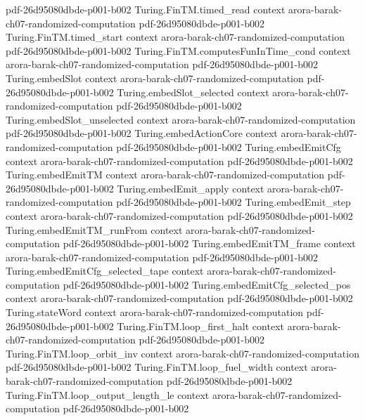 \begin{theorem}
  {pdf-26d95080dbde-p001-b002}
\proofstep
  {Turing.FinTM.timed_read}
  {context}
  {arora-barak-ch07-randomized-computation}
  {pdf-26d95080dbde-p001-b002}
\proofstep
  {Turing.FinTM.timed_start}
  {context}
  {arora-barak-ch07-randomized-computation}
  {pdf-26d95080dbde-p001-b002}
\proofstep
  {Turing.FinTM.computesFunInTime_cond}
  {context}
  {arora-barak-ch07-randomized-computation}
  {pdf-26d95080dbde-p001-b002}
\proofstep
  {Turing.embedSlot}
  {context}
  {arora-barak-ch07-randomized-computation}
  {pdf-26d95080dbde-p001-b002}
\proofstep
  {Turing.embedSlot_selected}
  {context}
  {arora-barak-ch07-randomized-computation}
  {pdf-26d95080dbde-p001-b002}
\proofstep
  {Turing.embedSlot_unselected}
  {context}
  {arora-barak-ch07-randomized-computation}
  {pdf-26d95080dbde-p001-b002}
\proofstep
  {Turing.embedActionCore}
  {context}
  {arora-barak-ch07-randomized-computation}
  {pdf-26d95080dbde-p001-b002}
\proofstep
  {Turing.embedEmitCfg}
  {context}
  {arora-barak-ch07-randomized-computation}
  {pdf-26d95080dbde-p001-b002}
\proofstep
  {Turing.embedEmitTM}
  {context}
  {arora-barak-ch07-randomized-computation}
  {pdf-26d95080dbde-p001-b002}
\proofstep
  {Turing.embedEmit_apply}
  {context}
  {arora-barak-ch07-randomized-computation}
  {pdf-26d95080dbde-p001-b002}
\proofstep
  {Turing.embedEmit_step}
  {context}
  {arora-barak-ch07-randomized-computation}
  {pdf-26d95080dbde-p001-b002}
\proofstep
  {Turing.embedEmitTM_runFrom}
  {context}
  {arora-barak-ch07-randomized-computation}
  {pdf-26d95080dbde-p001-b002}
\proofstep
  {Turing.embedEmitTM_frame}
  {context}
  {arora-barak-ch07-randomized-computation}
  {pdf-26d95080dbde-p001-b002}
\proofstep
  {Turing.embedEmitCfg_selected_tape}
  {context}
  {arora-barak-ch07-randomized-computation}
  {pdf-26d95080dbde-p001-b002}
\proofstep
  {Turing.embedEmitCfg_selected_pos}
  {context}
  {arora-barak-ch07-randomized-computation}
  {pdf-26d95080dbde-p001-b002}
\proofstep
  {Turing.stateWord}
  {context}
  {arora-barak-ch07-randomized-computation}
  {pdf-26d95080dbde-p001-b002}
\proofstep
  {Turing.FinTM.loop_first_halt}
  {context}
  {arora-barak-ch07-randomized-computation}
  {pdf-26d95080dbde-p001-b002}
\proofstep
  {Turing.FinTM.loop_orbit_inv}
  {context}
  {arora-barak-ch07-randomized-computation}
  {pdf-26d95080dbde-p001-b002}
\proofstep
  {Turing.FinTM.loop_fuel_width}
  {context}
  {arora-barak-ch07-randomized-computation}
  {pdf-26d95080dbde-p001-b002}
\proofstep
  {Turing.FinTM.loop_output_length_le}
  {context}
  {arora-barak-ch07-randomized-computation}
  {pdf-26d95080dbde-p001-b002}
\proofstep

\end{theorem}
